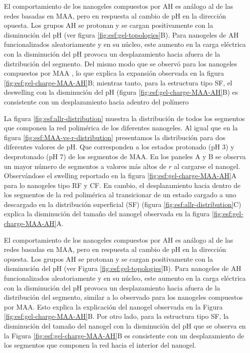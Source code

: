 El comportamiento de los nanogeles compuestos por AH es an\'alogo al de las redes basadas en MAA, pero en respuesta al cambio de pH en la direcci\'on opuesta.
Los grupos AH se protonan y se cargan positivamente con la disminuci\'on del pH (ver figura \ref{fig:esf:gel-topologies}B).
Para nanogeles de AH funcionalizados aleatoriamente y en su n\'ucleo, este aumento en la carga el\'ectrica con la disminuci\'on del pH provoca un desplazamiento hacia afuera de la distribuci\'on del segmento. Del mismo modo que se observ\'o para los nanogeles compuestos por MAA%
, lo que explica la expansi\'on observada en la figura \ref{fig:esf:gel-charge-MAA-AH}B;
mientras tanto, para la estructura tipo SF, el deswelling con la disminuci\'on del pH (figura \ref{fig:esf:gel-charge-MAA-AH}B) es consistente con un desplazamiento hacia adentro del pol\'imero %


La figura \ref{fig:esf:allr-distribution} muestra la distribuci\'on de todos los segmentos que componen la red polim\'erica de los diferentes nanogeles. 
Al igual que en la figura \ref{fig:esf:MAA-vs-r-distribution} presentamos la distribuci\'on para dos diferentes valores de pH. Que corresponden a los estados protonado (pH 3) y desprotonado (pH 7) de los segmentos de MAA.  En los paneles A y B se observa un mayor n\'umero de segmentos a valores m\'as altos de $r$ al cargarse el nanogel. Observ\'andose el swelling reportado en la figura \ref{fig:esf:gel-charge-MAA-AH}A para lo nanogeles tipo RF y CF.
En cambio, el desplazamiento hacia dentro de los segmentos de la red polim\'erica al transicionar de un estado cargado a uno descargado en la distribuci\'on superficial (SF) (figura \ref{fig:esf:allr-distribution}C) explica la disminuci\'on del tama\~no del nanogel observada en la figura \ref{fig:esf:gel-charge-MAA-AH}A.

El comportamiento de los nanogeles compuestos por AH es an\'alogo al de las redes basadas en MAA, pero en respuesta al cambio de pH en la direcci\'on opuesta. Los grupos AH se protonan y se cargan positivamente con la disminuci\'on del pH (ver Figura \ref{fig:esf:gel-topologies}B). Para nanogeles de AH funcionalizados aleatoriamente y en su n\'ucleo, este aumento en la carga el\'ectrica con la disminuci\'on del pH provoca un desplazamiento hacia afuera de la distribuci\'on del segmento, similar a lo observado para los nanogeles compuestos por MAA. Esto explica la explicaci\'on del nanogel  observada en la Figura \ref{fig:esf:gel-charge-MAA-AH}B. Por otro lado, para la estructura tipo SF, la disminuci\'on del tama\~no del nanogel  con la disminuci\'on del pH que se observa en la Figura \ref{fig:esf:gel-charge-MAA-AH}B es consistente con un desplazamiento de los segmentos que componen la red hacia el interior del nanogel.%

